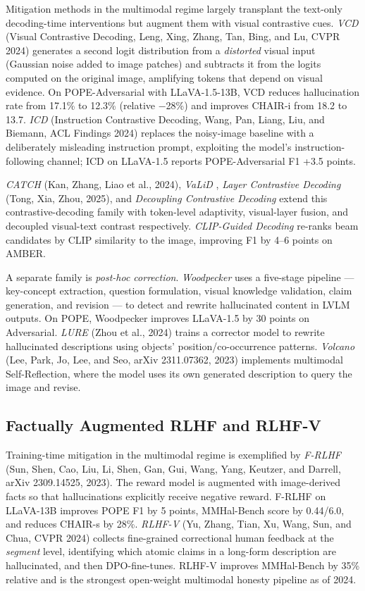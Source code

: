 \documentclass{article}
\begin{document}
Mitigation methods in the multimodal regime largely transplant the text-only decoding-time interventions but augment them with visual contrastive cues. \emph{VCD} (Visual Contrastive Decoding, Leng, Xing, Zhang, Tan, Bing, and Lu, CVPR 2024) generates a second logit distribution from a \emph{distorted} visual input (Gaussian noise added to image patches) and subtracts it from the logits computed on the original image, amplifying tokens that depend on visual evidence. On POPE-Adversarial with LLaVA-1.5-13B, VCD reduces hallucination rate from 17.1\% to 12.3\% (relative −28\%) and improves CHAIR-i from 18.2 to 13.7. \emph{ICD} (Instruction Contrastive Decoding, Wang, Pan, Liang, Liu, and Biemann, ACL Findings 2024) replaces the noisy-image baseline with a deliberately misleading instruction prompt, exploiting the model's instruction-following channel; ICD on LLaVA-1.5 reports POPE-Adversarial F1 +3.5 points.

\emph{CATCH} (Kan, Zhang, Liao et al., 2024), \emph{VaLiD} \citep{wang2024factualityoflargel}, \emph{Layer Contrastive Decoding} (Tong, Xia, Zhou, 2025), and \emph{Decoupling Contrastive Decoding} \citep{chen2024unifiedhallucinati} extend this contrastive-decoding family with token-level adaptivity, visual-layer fusion, and decoupled visual-text contrast respectively. \emph{CLIP-Guided Decoding} \citep{deng2024seeingisbelievingm} re-ranks beam candidates by CLIP similarity to the image, improving F1 by 4--6 points on AMBER.

A separate family is \emph{post-hoc correction}. \emph{Woodpecker} \citep{yin2023asurveyonmultimoda} uses a five-stage pipeline --- key-concept extraction, question formulation, visual knowledge validation, claim generation, and revision --- to detect and rewrite hallucinated content in LVLM outputs. On POPE, Woodpecker improves LLaVA-1.5 by 30 points on Adversarial. \emph{LURE} (Zhou et al., 2024) trains a corrector model to rewrite hallucinated descriptions using objects' position/co-occurrence patterns. \emph{Volcano} (Lee, Park, Jo, Lee, and Seo, arXiv 2311.07362, 2023) implements multimodal Self-Reflection, where the model uses its own generated description to query the image and revise.

\subsection{Factually Augmented RLHF and RLHF-V}\label{factually-augmented-rlhf-and-rlhf-v}

Training-time mitigation in the multimodal regime is exemplified by \emph{F-RLHF} (Sun, Shen, Cao, Liu, Li, Shen, Gan, Gui, Wang, Yang, Keutzer, and Darrell, arXiv 2309.14525, 2023). The reward model is augmented with image-derived facts so that hallucinations explicitly receive negative reward. F-RLHF on LLaVA-13B improves POPE F1 by 5 points, MMHal-Bench score by 0.44/6.0, and reduces CHAIR-s by 28\%. \emph{RLHF-V} (Yu, Zhang, Tian, Xu, Wang, Sun, and Chua, CVPR 2024) collects fine-grained correctional human feedback at the \emph{segment} level, identifying which atomic claims in a long-form description are hallucinated, and then DPO-fine-tunes. RLHF-V improves MMHal-Bench by 35\% relative and is the strongest open-weight multimodal honesty pipeline as of 2024.
\end{document}
